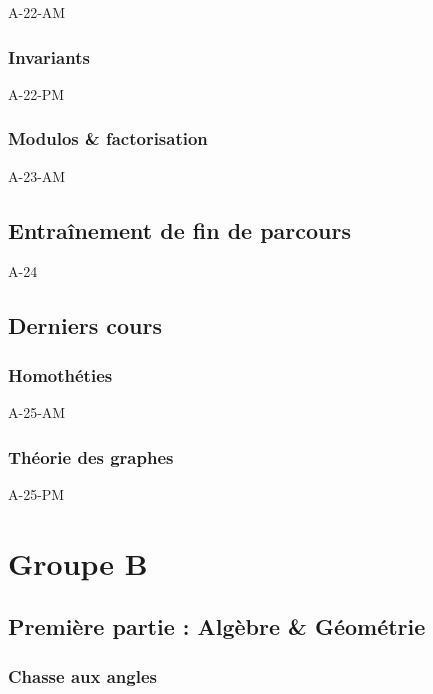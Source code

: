 \documentclass[poly,trombi]{valbonne}
\begin{document}
{A-22-AM}

\subsection{Invariants}

{A-22-PM}

\subsection{Modulos \& factorisation}

{A-23-AM}


\section{Entraînement de fin de parcours}

{A-24}


\section{Derniers cours}

\subsection{Homothéties}
{A-25-AM}

\subsection{Théorie des graphes}

{A-25-PM}






\chapter{Groupe B}

\minitoc \clearpage

\section{Première partie : Algèbre \& Géométrie}

\subsection{Chasse aux angles}
\end{document}
